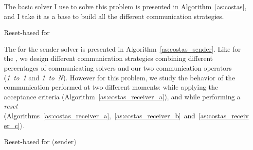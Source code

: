 The basic solver I use to solve this problem is presented in Algorithm~\ref{as:costas}, and I take it as a base to build all the different communication strategies.  

\begin{algorithm}[H]
\dontprintsemicolon
\SetNoline
{}
\caption{Reset-based \as{} for \CARRP}\label{as:costas}
\end{algorithm}

The \as{} for the sender solver is presented in Algorithm~\ref{as:costas_sender}. Like for the \sgp, we design different communication strategies combining different percentages of communicating solvers and our two communication operators ({\it 1~to~1} and {\it 1~to~N}). However for this problem, we study the behavior of the communication performed at two different moments: while applying the acceptance criteria (Algorithm~\ref{as:costas_receiver_a}), and while performing a {\it reset} (Algorithms~\ref{as:costas_receiver_a},~\ref{as:costas_receiver_b}~and~\ref{as:costas_receiver_c}).

\begin{algorithm}[H]
\dontprintsemicolon
\SetNoline
{}
\caption{Reset-based \as{} for \CARRP{} (sender)}\label{as:costas_sender}
\end{algorithm}

